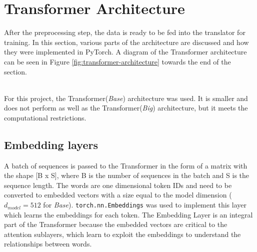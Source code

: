 \documentclass[12pt,a4paper,twoside,openright]{report}
\newenvironment{specialfootnote}
    {
    \renewcommand*{\thefootnote}{\fnsymbol{footnote}}
    }
    {
    \renewcommand*{\thefootnote}{\arabic{footnote}}
    }
\begin{document}




\section{Transformer Architecture}
\label{transformer-architecture}
After the preprocessing step, the data is ready to be fed into the translator for training. In this section, various parts of the architecture are discussed and how they were implemented in PyTorch. A diagram of the Transformer architecture can be seen in Figure \ref{fig:transformer-architecture} towards the end of the section.
\\\\
\begin{specialfootnote}
For this project, the Transformer(\textit{Base}\footnotemark[2]) architecture was used. It is smaller and does not perform as well as the Transformer(\textit{Big}\footnotemark[2]) architecture, but it meets the computational restrictions.

\end{specialfootnote}


\subsection{Embedding layers}
\label{embedding-layers}

A batch of sequences is passed to the Transformer in the form of a matrix with the shape [B x S], where B is the number of sequences in the batch and S is the sequence length. The words are one dimensional token IDs and need to be converted to embedded vectors with a size equal to the model dimension ($d_{model} = 512$ for \textit{Base}). \lstinline{torch.nn.Embeddings} was used to implement this layer which learns the embeddings for each token. The Embedding Layer is an integral part of the Transformer because the embedded vectors are critical to the attention sublayers, which learn to exploit the embeddings to understand the relationships between words.
\end{document}
